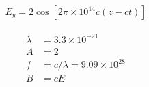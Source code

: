 \documentclass{article}
\begin{document}
\begin{equation*}
  \begin{aligned}
    E_y = 2 \cos \left[ 2 \pi \times 10^{14} c \left( z - ct \right) \right]
  \end{aligned}
\end{equation*}

\begin{equation*}
  \begin{aligned}
    \lambda &= 3.3 \times 10^{-21} \\
    A &= 2 \\
    f &= c/\lambda = 9.09 \times 10^{28} \\
    B &= c E
  \end{aligned}
\end{equation*}
\end{document}
